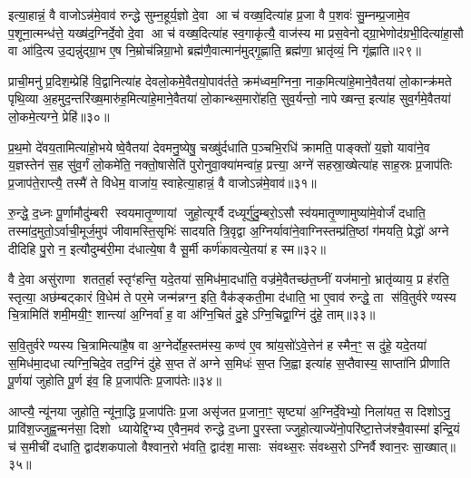इत्या॒हान्नं॒ वै वाजोऽन्न॑मे॒वाव॑ रुन्द्धे सुम्न॒हूर्य॒ज्ञो दे॒वा आ च॑ वख्ष॒दित्या॑ह प्र॒जा वै प॒शवः॑ सु॒म्नम्प्र॒जामे॒व प॒शूना॒त्मन्ध॑त्ते॒ यख्ष॑द॒ग्निर्दे॒वो दे॒वा आ च॑ वख्ष॒दित्या॑ह स्व॒गाकृ॑त्यै॒ वाज॑स्य मा प्रस॒वेनोद्ग्रा॒भेणोद॑ग्रभी॒दित्या॑हा॒सौ वा आ॑दि॒त्य उ॒द्यन्नु॑द्ग्रा॒भ ए॒ष नि॒म्रोच॑न्निग्रा॒भो ब्रह्म॑णै॒वात्मान॑मुद्गृ॒ह्णाति॒ ब्रह्म॑णा॒ भ्रातृ॑व्यं॒ नि गृ॑ह्णाति॥२९॥

{\anuvakamend[{प्रा॒णैः पोषोऽप्र॒त्याग्नीध्रे॒ पति॑मे॒ष दश॑ च॥६॥}]}

प्राची॒मनु॑ प्र॒दिश॒म्प्रेहि॑ वि॒द्वानित्या॑ह देवलो॒कमे॒वैतयो॒पाव॑र्तते॒ क्रम॑ध्वम॒ग्निना॒ नाक॒मित्या॑हे॒माने॒वैतया॑ लो॒कान्क्र॑मते पृथि॒व्या अ॒हमुद॒न्तरि॑ख्ष॒मारु॑ह॒मित्या॑हे॒माने॒वैतया॑ लो॒कान्थ्स॒मारो॑हति॒ सुव॒र्यन्तो॒ नापेख्षन्त॒ इत्या॑ह सुव॒र्गमे॒वैतया॑ लो॒कमे॒त्यग्ने॒ प्रेहि॑॥३०॥

प्र॒थ॒मो दे॑वय॒तामित्या॑हो॒भयेष्वे॒वैतया॑ देवमनु॒ष्येषु॒ चख्षु॑र्दधाति प॒ञ्चभि॒रधि॑ क्रामति॒ पाङ्क्तो॑ य॒ज्ञो यावा॑ने॒व य॒ज्ञस्तेन॑ स॒ह सु॑व॒र्गं लो॒कमे॑ति॒ नक्तो॒षासेति॑ पुरोनुवा॒क्या॑मन्वा॑ह॒ प्रत्त्या॒ अग्ने॑ सहस्रा॒ख्षेत्या॑ह साह॒स्रः प्र॒जाप॑तिः प्र॒जाप॑ते॒राप्त्यै॒ तस्मै॑ ते विधेम॒ वाजा॑य॒ स्वाहेत्या॒हान्नं॒ वै वाजोऽन्न॑मे॒वाव॑॥३१॥

रु॒न्द्धे॒ द॒ध्नः पू॒र्णामौदु॑म्बरी स्वयमातृ॒ण्णायां जुहो॒त्यूर्ग्वै दध्यूर्गु॑दु॒म्बरो॒ऽसौ स्व॑यमातृ॒ण्णामुष्या॑मे॒वोर्जं॑ दधाति॒ तस्मा॑द॒मुतो॒ऽर्वाची॒मूर्ज॒मुप॑ जीवामस्ति॒सृभिः॑ सादयति त्रि॒वृद्वा अ॒ग्निर्यावा॑ने॒वाग्निस्तम्प्र॑ति॒ष्ठां ग॑मयति॒ प्रेद्धो॑ अग्ने दीदिहि पु॒रो न॒ इत्यौदुम्ब॑री॒मा द॑धात्ये॒षा वै सू॒र्मी कर्ण॑कावत्ये॒तया॑ ह स्म॥३२॥

वै दे॒वा असु॑राणा शतत॒र्\mbox{}हास्तृꣳ॑हन्ति॒ यदे॒तया॑ स॒मिध॑मा॒दधा॑ति॒ वज्र॑मे॒वैतच्छ॑त॒घ्नीं यज॑मानो॒ भ्रातृ॑व्याय॒ प्र ह॑रति॒ स्तृत्या॒ अछ॑म्बट्कारं वि॒धेम॑ ते पर॒मे जन्म॑न्नग्न॒ इति॒ वैक॑ङ्कती॒मा द॑धाति॒ भा ए॒वाव॑ रुन्द्धे॒ ता स॑वि॒तुर्वरेण्यस्य चि॒त्रामिति॑ शमी॒मयी॒ꣳ॒ शान्त्या॑ अ॒ग्निर्वा॑ ह॒ वा अ॑ग्नि॒चितं॑ दु॒हेऽग्नि॒चिद्वा॒ग्निं दु॑हे॒ ताम्॥३३॥

स॒वि॒तुर्वरेण्यस्य चि॒त्रामित्या॑है॒ष वा अ॒ग्नेर्दोह॒स्तम॑स्य॒ कण्व॑ ए॒व श्रा॑य॒सो॑ऽवे॒त्तेन॑ ह स्मैन॒ꣳ॒ स दु॑हे॒ यदे॒तया॑ स॒मिध॑मा॒दधात्यग्नि॒चिदे॒व तद॒ग्निं दु॑हे स॒प्त ते॑ अग्ने स॒मिधः॑ स॒प्त जि॒ह्वा इत्या॑ह स॒प्तैवास्य॒ साप्ता॑नि प्रीणाति पू॒र्णया॑ जुहोति पू॒र्ण इ॑व॒ हि प्र॒जाप॑तिः प्र॒जाप॑तेः॥३४॥

आप्त्यै॒ न्यू॑नया जुहोति॒ न्यू॑ना॒द्धि प्र॒जाप॑तिः प्र॒जा असृ॑जत प्र॒जाना॒ꣳ॒ सृष्ट्या॑ अ॒ग्निर्दे॒वेभ्यो॒ निला॑यत॒ स दिशोऽनु॒ प्रावि॑श॒ज्जुह्व॒न्मन॑सा॒ दिशो ध्यायेद्दि॒ग्भ्य ए॒वैन॒मव॑ रुन्द्धे द॒ध्ना पु॒रस्ताज्जुहो॒त्याज्ये॑नो॒परि॑ष्टा॒त्तेज॑श्चै॒वास्मा॑ इन्द्रि॒यं च॑ स॒मीची॑ दधाति॒ द्वाद॑शकपालो वैश्वान॒रो भ॑वति॒ द्वाद॑श॒ मासाः संवथ्स॒रः सं॑वथ्स॒रोऽग्निर्वैश्वान॒रः सा॒ख्षात्॥३५॥

